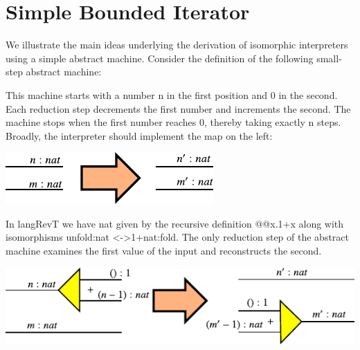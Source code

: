 \documentclass{llncs}
\begin{document}
\section{Simple Bounded Iterator}
We illustrate the main ideas underlying the derivation of isomorphic
interpreters using a simple abstract machine.  Consider the definition
of the following small-step abstract machine:
\begin{multicols}{2}

\end{multicols}

  
This machine starts with a number {{n}} in the first position and
{{0}} in the second. Each reduction step decrements the first number
and increments the second. The machine stops when the first number
reaches 0, thereby taking exactly {{n}} steps.  
Broadly, the interpreter should implement the map on the left:

\begin{center}
  \includegraphics{diagrams/nat-nat1.pdf}
\end{center}


In {{langRevT}} we have {{nat}} given by the recursive definition
{{@@x.1+x}} along with isomorphisms {{unfold:nat <->1+nat:fold}}. The
only reduction step of the abstract machine examines the first value
of the input and reconstructs the second.

\begin{center}
  \includegraphics{diagrams/nat-nat3.pdf}
\end{center}
\end{document}
